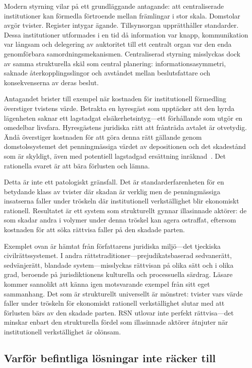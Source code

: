 \documentclass[11pt,a4paper,twocolumn]{article}
\begin{document}
Modern styrning vilar på ett grundläggande antagande: att centraliserade institutioner kan förmedla förtroende mellan främlingar i stor skala. Domstolar avgör tvister. Register intygar ägande. Tillsynsorgan upprätthåller standarder. Dessa institutioner utformades i en tid då information var knapp, kommunikation var långsam och delegering av auktoritet till ett centralt organ var den enda genomförbara samordningsmekanismen. Centraliserad styrning misslyckas dock av samma strukturella skäl som central planering: informationsasymmetri, saknade återkopplingsslingor och avståndet mellan beslutsfattare och konsekvenserna av deras beslut.

Antagandet brister till exempel när kostnaden för institutionell förmedling överstiger tvistens värde. Betrakta en hyresgäst som upptäcker att den hyrda lägenheten saknar ett lagstadgat elsäkerhetsintyg---ett förhållande som utgör en omedelbar livsfara. Hyresgästens juridiska rätt att frånträda avtalet är otvetydig. Ändå överstiger kostnaden för att göra denna rätt gällande genom domstolssystemet det penningmässiga värdet av depositionen och det skadestånd som är skyldigt, även med potentiell lagstadgad ersättning inräknad~\cite{czcourtfees}. Det rationella svaret är att bära förlusten och lämna.

Detta är inte ett patologiskt gränsfall. Det är standarderfarenheten för en betydande klass av tvister där skadan är verklig men de penningmässiga insatserna faller under tröskeln där institutionell verkställighet blir ekonomiskt rationell. Resultatet är ett system som strukturellt gynnar illasinnade aktörer: de som skadar andra i volymer under denna tröskel kan agera ostraffat, eftersom kostnaden för att söka rättvisa faller på den skadade parten.

Exemplet ovan är hämtat från författarens juridiska miljö---det tjeckiska civilrättssystemet. I andra rättstraditioner---prejudikatsbaserad sedvanerätt, sedvänjerätt, blandade system---misslyckas rättvisan på olika sätt och i olika grad, beroende på jurisdiktionens kulturella och processuella särdrag. Läsare kommer sannolikt att känna igen motsvarande exempel från sitt eget sammanhang. Det som är strukturellt universellt är mönstret: tvister vars värde faller under tröskeln för ekonomiskt rationell verkställighet slutar med att förlusten bärs av den skadade parten. RSN utlovar inte perfekt rättvisa---det minskar enbart den strukturella fördel som illasinnade aktörer åtnjuter när institutionell verkställighet är olönsam.

\subsection{Varför befintliga lösningar inte räcker till}
\end{document}
